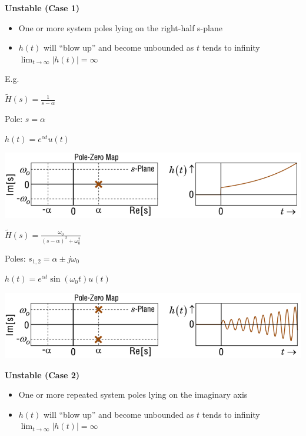 \documentclass[landscape,a4paper]{extarticle}
\newenvironment{Figure}
  {\par\medskip\noindent\minipage{\linewidth}}
  {\endminipage\par\medskip}
\begin{document}
\begin{multicols*}{5}
    \textbf{Unstable (Case 1)}
    \begin{itemize}
        \item One or more system poles lying on the right-half s-plane
        \item $h(t)$ will ``blow up'' and become unbounded as $t$ tends to infinity\\
        $\lim_{t \to \infty}|h(t)| = \infty$
    \end{itemize}

    E.g.

    $\tilde{H}(s) = \frac{1}{s - \alpha}$

    Pole: $s = \alpha$

    $h(t) = e^{\alpha t}u(t)$

    \begin{Figure}
        \centering
        \includegraphics[width=\linewidth]{unstableCase1_1.png}        
    \end{Figure}

    $\tilde{H}(s) = \frac{\omega_0}{(s - \alpha)^2 + \omega_0^2}$

    Poles: $s_{1,2} = \alpha \pm j\omega_0$

    $h(t) = e^{\alpha t}\sin (\omega_0 t) u (t)$

    \begin{Figure}
        \centering
        \includegraphics[width=\linewidth]{unstableCase1_2.png}        
    \end{Figure}

    \textbf{Unstable (Case 2)}
    \begin{itemize}
        \item One or more repeated system poles lying on the imaginary axis
        \item $h(t)$ will ``blow up'' and become unbounded as $t$ tends to infinity\\
        $\lim_{t \to \infty}|h(t)| = \infty$
    \end{itemize}


\end{multicols*}
\end{document}
